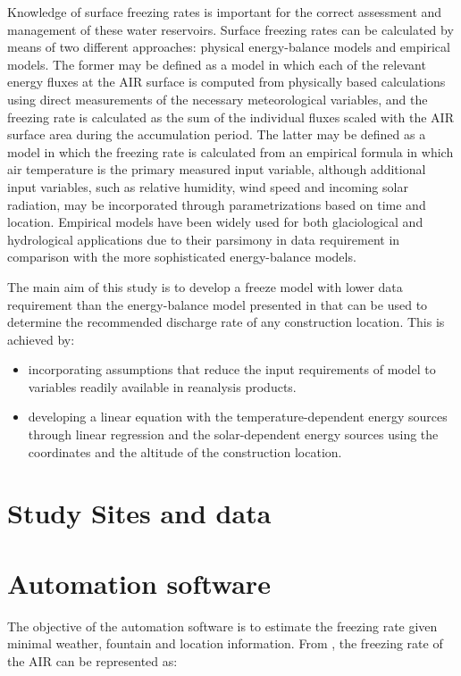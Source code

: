 \documentclass[utf8]{frontiersSCNS}
\begin{document}
Knowledge of surface freezing rates is important for the correct assessment and management of these water
reservoirs. Surface freezing rates can be calculated by means of two different approaches: physical
energy-balance models and empirical models. The former may be defined as a model in which each of the relevant
energy fluxes at the AIR surface is computed from physically based calculations using direct measurements of
the necessary meteorological variables, and the freezing rate is calculated as the sum of the individual fluxes
scaled with the AIR surface area during the accumulation period. The latter may be defined as a model in which
the freezing rate is calculated from an empirical formula in which air temperature is the primary measured
input variable, although additional input variables, such as relative humidity, wind speed and incoming solar
radiation, may be incorporated through parametrizations based on time and location. Empirical models
have been widely used for both glaciological and hydrological applications due to their parsimony in data
requirement in comparison with the more sophisticated energy-balance models.

The main aim of this study is to develop a freeze model with lower data requirement than the energy-balance
model presented in \cite{Balasubramanian_2022} that can be used to determine the recommended discharge rate of
any construction location. This is achieved by:

\begin{itemize}

  \item incorporating assumptions that reduce the input requirements of \cite{Balasubramanian_2022} model to
    variables readily available in reanalysis products.
  \item developing a linear equation with the temperature-dependent energy sources through linear regression and
    the solar-dependent energy sources using the coordinates and the altitude of the construction location. 

\end{itemize}


\section{Study Sites and data}

\section{Automation software}
The objective of the automation software is to estimate the freezing rate given minimal weather, fountain and
location information. From \cite{Balasubramanian_2022}, the freezing rate of the AIR can be represented as: 
\end{document}
